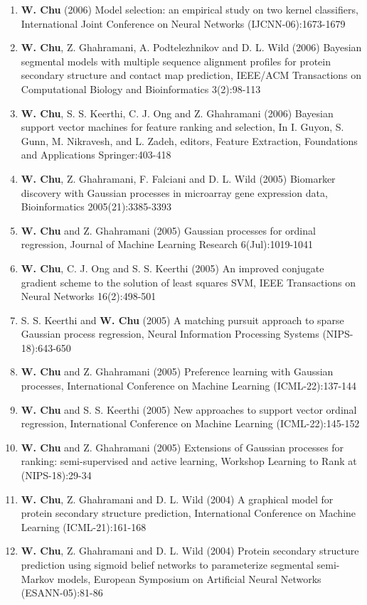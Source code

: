 \documentclass[line,10pt,final]{res}
\begin{document}
\begin{resume}
\begin{enumerate}
\item  {\bf W. Chu} (2006)  Model selection: an empirical study on two kernel classifiers, International Joint Conference on Neural Networks (IJCNN-06):1673-1679
\item  {\bf W. Chu}, Z. Ghahramani, A. Podtelezhnikov and D. L. Wild (2006) Bayesian segmental models with multiple sequence alignment profiles for protein secondary structure and contact map prediction, IEEE/ACM Transactions on Computational Biology and Bioinformatics 3(2):98-113  
\item  {\bf W. Chu}, S. S. Keerthi, C. J. Ong and Z. Ghahramani (2006)  Bayesian support vector machines for feature ranking and selection,   In I. Guyon, S. Gunn, M. Nikravesh, and L. Zadeh, editors, Feature Extraction, Foundations and Applications   Springer:403-418
\item  {\bf W. Chu}, Z. Ghahramani, F. Falciani and D. L. Wild (2005)  Biomarker discovery with Gaussian processes in microarray gene expression data,  Bioinformatics 2005(21):3385-3393  
\item  {\bf W. Chu} and Z. Ghahramani (2005)  Gaussian processes for ordinal regression,  Journal of Machine Learning Research 6(Jul):1019-1041  
\item  {\bf W. Chu}, C. J. Ong and S. S. Keerthi (2005)  An improved conjugate gradient scheme to the solution of least squares SVM,  IEEE Transactions on Neural Networks 16(2):498-501  
\item S. S. Keerthi and  {\bf W. Chu} (2005)  A matching pursuit approach to sparse Gaussian process regression, Neural Information Processing Systems (NIPS-18):643-650  
\item  {\bf W. Chu} and Z. Ghahramani (2005)  Preference learning with Gaussian processes, International Conference on Machine Learning (ICML-22):137-144  
\item  {\bf W. Chu} and S. S. Keerthi (2005)  New approaches to support vector ordinal regression,  International Conference on Machine Learning (ICML-22):145-152  
\item  {\bf W. Chu} and Z. Ghahramani (2005)  Extensions of Gaussian processes for ranking: semi-supervised and active learning, Workshop Learning to Rank at (NIPS-18):29-34  
\item  {\bf W. Chu}, Z. Ghahramani and D. L. Wild (2004)  A graphical model for protein secondary structure prediction,  International Conference on Machine Learning (ICML-21):161-168  
\item  {\bf W. Chu}, Z. Ghahramani and D. L. Wild (2004)  Protein secondary structure prediction using sigmoid belief networks to parameterize segmental semi-Markov models,  European Symposium on Artificial Neural Networks (ESANN-05):81-86

\end{enumerate}
\end{resume}
\end{document}
